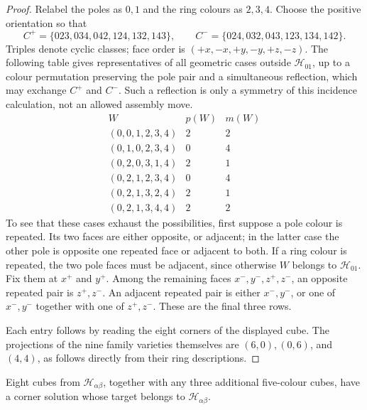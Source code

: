 \begin{proof}
Relabel the poles as $0,1$ and the ring colours as $2,3,4$.  Choose the
positive orientation so that
\[
 C^+=\{023,034,042,124,132,143\},\qquad
 C^-=\{024,032,043,123,134,142\}.
\]
Triples denote cyclic classes; face order is $(+x,-x,+y,-y,+z,-z)$.  The following table gives representatives of
all geometric cases outside $\mathcal H_{01}$, up to a colour permutation
preserving the pole pair and a simultaneous reflection, which may exchange
$C^+$ and $C^-$.  Such a reflection is only a symmetry of this incidence
calculation, not an allowed assembly move.
\[
\begin{array}{c|cc}
 W&p(W)&m(W)\\\hline
 (0,0,1,2,3,4)&2&2\\
 (0,1,0,2,3,4)&0&4\\
 (0,2,0,3,1,4)&2&1\\
 (0,2,1,2,3,4)&0&4\\
 (0,2,1,3,2,4)&2&1\\
 (0,2,1,3,4,4)&2&2
\end{array}
\]
To see that these cases exhaust the possibilities, first suppose a pole
colour is repeated.  Its two faces are either opposite, or adjacent; in
the latter case the other pole is opposite one repeated face or adjacent
to both.  If a ring colour is repeated, the two pole faces must be
adjacent, since otherwise $W$ belongs to $\mathcal H_{01}$.  Fix them at
$x^+$ and $y^+$.  Among the remaining faces $x^-,y^-,z^+,z^-$, an opposite
repeated pair is $z^+,z^-$.  An adjacent repeated pair is either $x^-,y^-$,
or one of $x^-,y^-$ together with one of $z^+,z^-$.  These are the final
three rows.

Each entry follows by reading the eight corners of the displayed cube.
The projections of the nine family
varieties themselves are $(6,0),(0,6)$, and $(4,4)$, as follows directly
from their ring descriptions.
\end{proof}

\begin{lemma}\label{lem:eight-common-missing}
Eight cubes from $\mathcal H_{\alpha\beta}$, together with any three additional
five-colour cubes, have a corner solution whose target belongs to
$\mathcal H_{\alpha\beta}$.
\end{lemma}

